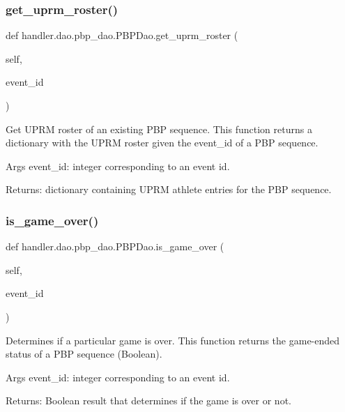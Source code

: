 \subsubsection{\texorpdfstring{get\+\_\+uprm\+\_\+roster()}{get\_uprm\_roster()}}
{\footnotesize\ttfamily def handler.\+dao.\+pbp\+\_\+dao.\+P\+B\+P\+Dao.\+get\+\_\+uprm\+\_\+roster (\begin{DoxyParamCaption}\item[{}]{self,  }\item[{}]{event\+\_\+id }\end{DoxyParamCaption})}

\begin{DoxyVerb}Get UPRM roster of an existing PBP sequence.
This function returns a dictionary with the UPRM roster given the event_id of a PBP sequence.

Args
    event_id: integer corresponding to an event id.

Returns:
    dictionary containing UPRM athlete entries for the PBP sequence.
\end{DoxyVerb}
 \mbox{\label{classhandler_1_1dao_1_1pbp__dao_1_1_p_b_p_dao_a402928f0a55ebe2f1295e0b6dac76123}} 
\subsubsection{\texorpdfstring{is\+\_\+game\+\_\+over()}{is\_game\_over()}}
{\footnotesize\ttfamily def handler.\+dao.\+pbp\+\_\+dao.\+P\+B\+P\+Dao.\+is\+\_\+game\+\_\+over (\begin{DoxyParamCaption}\item[{}]{self,  }\item[{}]{event\+\_\+id }\end{DoxyParamCaption})}

\begin{DoxyVerb}Determines if a particular game is over.
This function returns the game-ended status of a PBP sequence (Boolean).

Args
    event_id: integer corresponding to an event id.

Returns:
    Boolean result that determines if the game is over or not.
\end{DoxyVerb}
 \mbox{\label{classhandler_1_1dao_1_1pbp__dao_1_1_p_b_p_dao_ac288ed20d35ef9ececdb529a1d78bd18}} 

